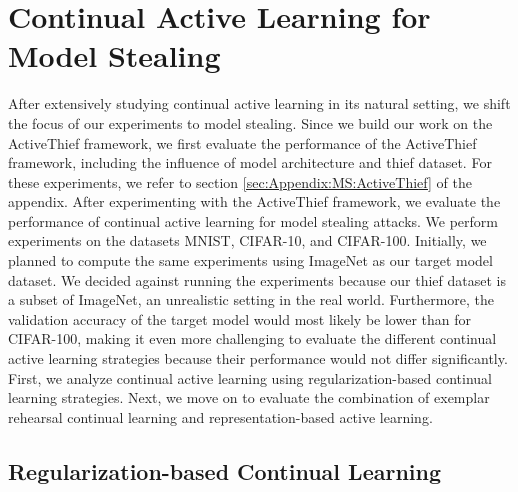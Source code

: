 \section{Continual Active Learning for Model Stealing}
\label{sec:Evaluation:MS}
After extensively studying continual active learning in its natural setting, we shift the focus of our experiments to model stealing. Since we build our work on the ActiveThief framework,
we first evaluate the performance of the ActiveThief framework, including the influence of model architecture and thief dataset. For these experiments, we refer to
section \ref{sec:Appendix:MS:ActiveThief} of the appendix. After experimenting with the ActiveThief framework, we evaluate the performance of continual active learning
for model stealing attacks. We perform experiments on the datasets MNIST, CIFAR-10, and CIFAR-100. Initially, we planned to compute the same experiments using ImageNet
as our target model dataset. We decided against running the experiments because our thief dataset is a subset of ImageNet, an unrealistic setting in 
the real world. Furthermore, the validation accuracy of the target model would most likely be lower than for CIFAR-100, making it even more challenging to
evaluate the different continual active learning strategies because their performance would not differ significantly. First, we analyze continual active
learning using regularization-based continual learning strategies. Next, we move on to evaluate the combination of exemplar rehearsal continual learning and
representation-based active learning. \par


\subsection{Regularization-based Continual Learning}
\label{sec:Evaluation:MS:Regularization}

